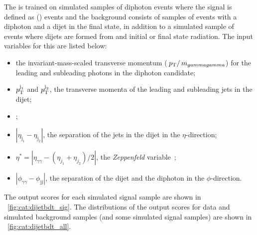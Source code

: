 The \DiJetBdt is trained on simulated samples of diphoton events where the signal is defined as \VBF (\Hgg) events and the background consists of samples of \SM events with a diphoton and a dijet in the final state, in addition to a simulated sample of \ggH events where dijets are formed from \PU and initial or final state radiation. The input variables for this \BDT are listed below:
\begin{itemize}
\item the invariant-mass-scaled transverse momentum ($\,p_\text{T}/\,m_{gammagamma}$) for the leading and subleading photons in the diphoton candidate;
\item $p_{\mathrm{T}}^{\text{j}_1}$ and $p_{\mathrm{T}}^{\text{j}_2}$, the transverse momenta of the leading and subleading jets in the dijet;
\item \mjj;
\item $|\eta_{\text{j}_1} - \eta_{\text{j}_2}|$, the separation of the jets in the dijet in the $\eta$-direction;
\item $\eta^{*} = |\eta_{\gamma\gamma} - (\eta_{j_1}+\eta_{j_2})/2|$, the \emph{Zeppenfeld} variable~\cite{Zeppenfeld};
\item $|\phi_{\gamma\gamma} - \phi_\text{jj}|$, the separation of the dijet and the diphoton in the $\phi$-direction.
\end{itemize}

The \DiJetBdt output scores for each simulated signal sample are shown in \Fig~\ref{fig:cat:dijetbdt_sig}. The distributions of the \DiJetBdt output scores for data and simulated background samples (and some simulated signal samples) are shown in \Fig~\ref{fig:cat:dijetbdt_all}. 

